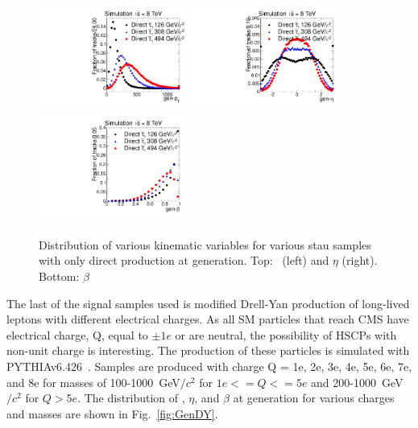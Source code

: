\begin{figure}
 \begin{center}
  \includegraphics[clip=false, trim=0.0cm 0cm 1.4cm 0cm, width=0.44\textwidth]{figures/muonly/Selection_Comp_PPStau_genpT}
  \includegraphics[clip=false, trim=0.0cm 0cm 1.4cm 0cm, width=0.44\textwidth]{figures/muonly/Selection_Comp_PPStau_geneta}
  \includegraphics[clip=false, trim=0.0cm 0cm 1.4cm 0cm, width=0.44\textwidth]{figures/muonly/Selection_Comp_PPStau_genbeta}
 \end{center}
 \caption[Distribution of \pt, $\eta$, and $\beta$ for various Pair Prod. stau samples at generation]
{Distribution of various kinematic variables for various stau samples with only direct production at generation.
Top: \pt\ (left) and $\eta$ (right).
Bottom: $\beta$
   \label{fig:GenPPStau}}
\end{figure}

The last of the signal samples used is modified Drell-Yan production of long-lived leptons with different electrical charges.
As all SM particles that reach CMS have electrical charge, Q, equal to $\pm1e$ or
are neutral, the possibility of HSCPs with non-unit charge is interesting. 
The production of these particles is simulated with PYTHIAv6.426~\cite{Sjostrand:2006za}. 
Samples are produced with charge Q = 1e, 2e, 3e, 4e, 5e, 6e, 7e, and 8e for masses of 
100-1000~GeV$/c^2$ for $1e <= Q <= 5e$ and 200-1000~GeV$/c^2$ for $Q > 5e$.
The distribution of \pt, $\eta$, and $\beta$ at generation for various charges and masses are shown in Fig.~\ref{fig:GenDY}.

